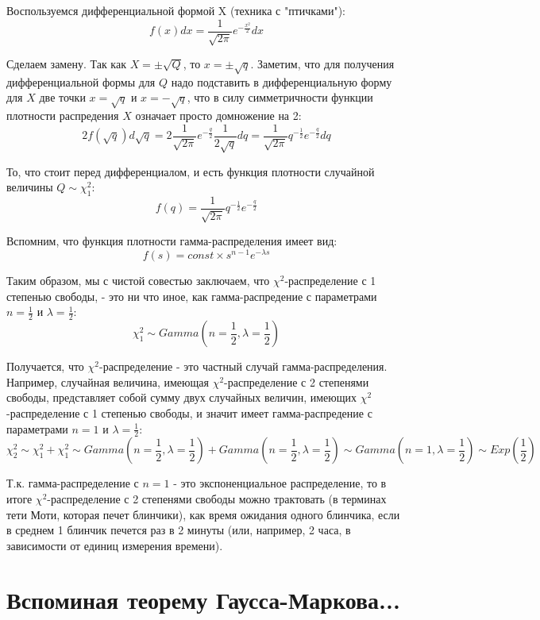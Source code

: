 \documentclass[12pt]{article} %
\theoremstyle{definition} %
\def \cChi{\mathcal{\chi}}
\begin{document}
Воспользуемся дифференциальной формой X (техника с "птичками"):
    \[
        f(x)dx=\frac{1}{\sqrt{2\pi}}e^{-\frac{x^2}{2}}dx
    \]

Сделаем замену. Так как $X=\pm \sqrt{Q}$, то $x=\pm \sqrt{q}$. Заметим, что для получения дифференциальной формы для $Q$ надо подставить в дифференциальную форму для $X$ две точки $x= \sqrt{q}$ и $x=- \sqrt{q}$, что в силу симметричности функции плотности распредения $X$ означает просто домножение на 2:
    \[
        2f(\sqrt{q})d\sqrt{q} = 2 \frac{1}{\sqrt{2\pi}} e^{-\frac{q}{2}} \frac{1}{2 \sqrt{q}} dq = \frac{1}{\sqrt{2\pi}} q^{-\frac{1}{2}} e^{-\frac{q}{2}} dq
    \]

То, что стоит перед дифференциалом, и есть функция плотности случайной величины $Q \sim \cChi_1^2$:
    \[
         f(q) = \frac{1}{\sqrt{2\pi}} q^{-\frac{1}{2}} e^{-\frac{q}{2}}
    \]

Вспомним, что функция плотности гамма-распределения имеет вид:
    \[
         f(s) = const \times s^{n-1} e^{-\lambda s}
    \]

Таким образом, мы с чистой совестью заключаем, что $\chi^2$-распределение с 1 степенью свободы, - это ни что иное, как гамма-распредение с параметрами $n=\frac{1}{2}$ и $\lambda=\frac{1}{2}$:
    \[
        \cChi_1^2 \sim Gamma(n=\frac{1}{2}, \lambda=\frac{1}{2})
    \]

Получается, что $\chi^2$-распределение - это частный случай гамма-распределения. Например, случайная величина, имеющая $\chi^2$-распределение с 2 степенями свободы, представляет собой сумму двух случайных величин, имеющих $\chi^2$-распределение с 1 степенью свободы, и значит имеет гамма-распредение с параметрами $n=1$ и $\lambda=\frac{1}{2}$:
    \[
        \cChi_2^2 \sim \cChi_1^2 + \cChi_1^2 \sim Gamma(n=\frac{1}{2}, \lambda=\frac{1}{2}) + Gamma(n=\frac{1}{2}, \lambda=\frac{1}{2}) \sim Gamma(n=1, \lambda=\frac{1}{2}) \sim Exp(\frac{1}{2})
    \]

Т.к. гамма-распределение с $n=1$ - это экспоненциальное распределение, то в итоге $\chi^2$-распределение с 2 степенями свободы можно трактовать (в терминах тети Моти, которая печет блинчики), как время ожидания одного блинчика, если в среднем 1 блинчик печется раз в 2 минуты (или, например, 2 часа, в зависимости от единиц измерения времени).



\section{Вспоминая теорему Гаусса-Маркова...}
\end{document}
